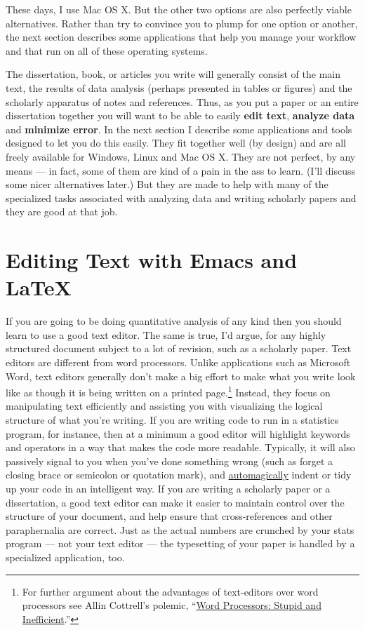 \documentclass[11pt,article,oneside]{memoir}
\begin{document}
These days, I use Mac OS X. But the other two options are also perfectly viable alternatives. Rather than try to convince you to plump for one option or another, the next section describes some applications that help you manage your workflow and that run on all of these operating systems.

The dissertation, book, or articles you write will generally consist of the main text, the results of data analysis (perhaps presented in tables or figures) and the scholarly apparatus of notes and references. Thus, as you  put a paper or an entire dissertation together you will want to be able to easily \textbf{edit text}, \textbf{analyze data} and \textbf{minimize error}. In the next section I describe some applications and tools designed to let you do this easily. They fit together well (by design) and are all freely available for Windows, Linux and Mac OS X. They are not perfect, by any means --- in fact, some of them are kind of a pain in the ass to learn. (I'll discuss some nicer alternatives later.) But they are made to help with many of the specialized tasks associated with analyzing data and writing scholarly papers and they are good at that job.                                                      

\section{Editing Text with Emacs and LaTeX}
If you are going to be doing quantitative analysis of any kind then you should learn to use a good text editor. The same is true, I'd argue, for any highly structured document subject to a lot of revision, such as a scholarly paper. Text editors are different from word processors. Unlike applications such as Microsoft Word, text editors generally don't make a big effort to make what you write look like as though it is being written on a printed page.\footnote{For further argument about the advantages of text-editors over word processors see Allin Cottrell's polemic, ``\href{http://www.ecn.wfu.edu/~cottrell/wp.html}{Word Processors: Stupid and Inefficient}.''} Instead, they focus on manipulating text efficiently and assisting you with visualizing the logical structure of what you're writing. If you are writing code to run in a statistics program, for instance, then at a minimum a good editor will highlight keywords and operators in a way that makes the code more readable. Typically, it will also passively signal to you when you've done something wrong (such as forget a closing brace or semicolon or quotation mark), and    \href{http://en.wiktionary.org/wiki/automagical}{automagically} indent or tidy up your code in an intelligent way. If you are writing a scholarly paper or a dissertation, a good text editor can make it easier to maintain control over the structure of your document, and help ensure that cross-references and other paraphernalia are correct. Just as the actual numbers are crunched by your stats program --- not your text editor --- the typesetting of your paper is handled by a specialized application, too.
\end{document}
